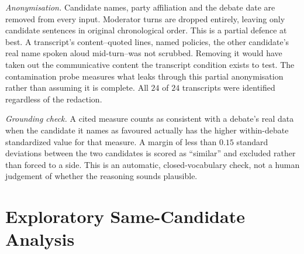 \documentclass[pdflatex,sn-apa]{sn-jnl}%
\begin{document}
\emph{Anonymisation.} Candidate names, party affiliation and the debate
date are removed from every input. Moderator turns are dropped entirely,
leaving only candidate sentences in original chronological order. This is
a partial defence at best. A transcript's content--quoted lines, named
policies, the other candidate's real name spoken aloud mid-turn--was not
scrubbed. Removing it would have taken out the communicative content the
transcript condition exists to test. The contamination probe measures what
leaks through this partial anonymisation rather than assuming it is
complete. All $24$ of $24$ transcripts were identified regardless of the
redaction.

\emph{Grounding check.} A cited measure counts as consistent with a
debate's real data when the candidate it names as favoured actually has
the higher within-debate standardized value for that measure. A margin of
less than $0.15$ standard deviations between the two candidates is scored
as ``similar'' and excluded rather than forced to a side. This is an
automatic, closed-vocabulary check, not a human judgement of whether the
reasoning sounds plausible.

\section{Exploratory Same-Candidate Analysis}
\label{s:samecand}
\end{document}
